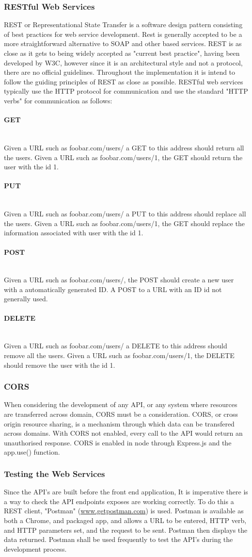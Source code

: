 \documentclass[a4paper]{article}
\newcommand{\subsubsubsection}[1]{\paragraph{#1}\mbox{}\\}
\begin{document}
\subsubsection{RESTful Web Services}
REST or Representational State Transfer is a software design pattern consisting of best practices for web service development. Rest is generally accepted to be a more straightforward alternative to SOAP and other based services. REST is as close as it gets to being widely accepted as "current best practice", having been developed by W3C, however since it is an architectural style and not a protocol, there are no official guidelines. Throughout the implementation it is intend to follow the guiding principles of REST as close as possible.
RESTful web services typically use the HTTP protocol for communication and use the standard "HTTP verbs" for communication as follows:
\subsubsubsection{GET} Given a URL such as foobar.com/users/ a GET to this address should return all the users. Given a URL such as foobar.com/users/1, the GET should return the user with the id 1.
\subsubsubsection{PUT}
Given a URL such as foobar.com/users/ a PUT to this address should replace all the users. Given a URL such as foobar.com/users/1, the GET should replace the information associated with user with the id 1.
\subsubsubsection{POST} Given a URL such as foobar.com/users/, the POST should create a new user with a automatically generated ID. A POST to a URL with an ID id not generally used.
\subsubsubsection{DELETE}  Given a URL such as foobar.com/users/ a DELETE to this address should remove all the users. Given a URL such as foobar.com/users/1, the DELETE should remove the user with the id 1.
\subsubsection{CORS}
When considering the development of any API, or any system where resources are transferred across domain, CORS must be a consideration. CORS, or cross origin resource sharing, is a mechanism through which data can be transfered across domains. With CORS not enabled, every call to the API would return an unauthorised response. CORS is enabled in node through Express.js and the app.use() function.
\subsubsection{Testing the Web Services}
Since the API's are built before the front end application, It is imperative there is a way to check the API endpoints exposes are working correctly. To do this a REST client,  "Postman" (\url{www.getpostman.com}) is used. Postman is available as both a Chrome, and packaged app, and allows a URL to be entered, HTTP verb, and HTTP parameters set, and the request to be sent. Postman then displays the data returned. Postman shall be used frequently to test the API's during the development process.
\end{document}
